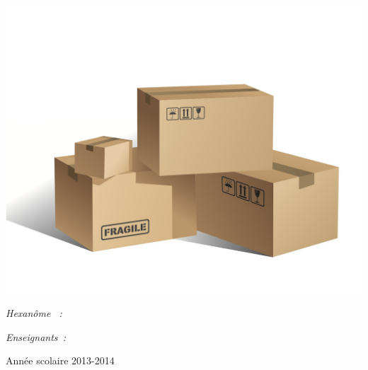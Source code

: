 \begin{center}
	\includegraphics [scale=0.30]{images/livraison.jpg} \\[0.7cm]
	\begin{minipage}[t]{0.4\textwidth}
	  \begin{flushleft} \large
	    \emph{Hexanôme \textbf{\hexanome}~:}\\
	    \small \reportauthor
	  \end{flushleft}
	\end{minipage}
	\begin{minipage}[t]{0.5\textwidth}
	  \begin{flushright} \large
	    \emph{Enseignants~:} \\
	    \enseignants
	  \end{flushright}
	\end{minipage}

	\vfill
	\footnotesize{Année scolaire 2013-2014}
\end{center}
